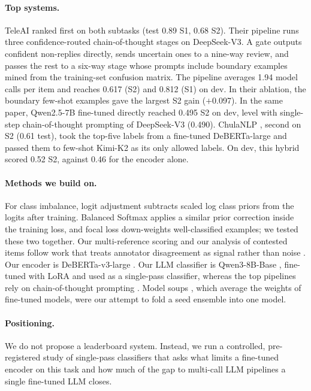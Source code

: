 \paragraph{Top systems.}
TeleAI \citep{shi-etal-2026-teleai} ranked first on both subtasks (test 0.89 S1, 0.68 S2).
Their pipeline runs three confidence-routed chain-of-thought stages on DeepSeek-V3.
A gate outputs confident non-replies directly, sends uncertain ones to a nine-way review, and passes the rest to a six-way stage whose prompts include boundary examples mined from the training-set confusion matrix.
The pipeline averages 1.94 model calls per item and reaches 0.617 (S2) and 0.812 (S1) on dev.
In their ablation, the boundary few-shot examples gave the largest S2 gain ($+$0.097).
In the same paper, Qwen2.5-7B fine-tuned directly reached 0.495 S2 on dev, level with single-step chain-of-thought prompting of DeepSeek-V3 (0.490).
ChulaNLP \citep{peerachaidecho-rutherford-2026-chulanlp}, second on S2 (0.61 test), took the top-five labels from a fine-tuned DeBERTa-large and passed them to few-shot Kimi-K2 as its only allowed labels.
On dev, this hybrid scored 0.52 S2, against 0.46 for the encoder alone.

\paragraph{Methods we build on.}
For class imbalance, logit adjustment \citep{menon2021longtail} subtracts scaled log class priors from the logits after training.
Balanced Softmax \citep{ren2020balanced} applies a similar prior correction inside the training loss, and focal loss \citep{lin2017focal} down-weights well-classified examples; we tested these two together.
Our multi-reference scoring and our analysis of contested items follow work that treats annotator disagreement as signal rather than noise \citep{plank-etal-2014-linguistically,uma2021learning}.
Our encoder is DeBERTa-v3-large \citep{he2023debertav3}.
Our LLM classifier is Qwen3-8B-Base \citep{qwen3}, fine-tuned with LoRA \citep{hu2022lora} and used as a single-pass classifier, whereas the top pipelines rely on chain-of-thought prompting \citep{wei2022chain}.
Model soups \citep{wortsman2022soups}, which average the weights of fine-tuned models, were our attempt to fold a seed ensemble into one model.

\paragraph{Positioning.}
We do not propose a leaderboard system.
Instead, we run a controlled, pre-registered study of single-pass classifiers that asks what limits a fine-tuned encoder on this task and how much of the gap to multi-call LLM pipelines a single fine-tuned LLM closes.
